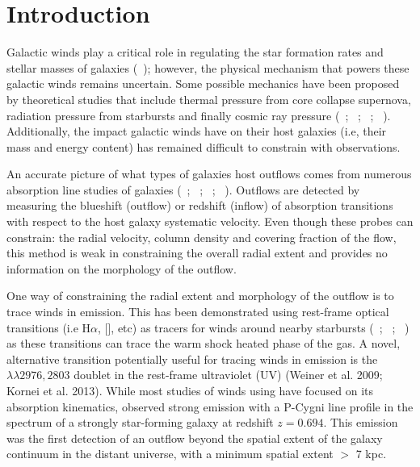 \documentclass[twocolumn]{aastex61}
\newcommand{\citeth}[1]{(\citeauthor{#1}\ \citeyear{#1})}
\newcommand{\citethnop}[1]{\citeauthor{#1}\ \citeyear{#1}}
\begin{document}

\section{Introduction}\label{sec:intro}
Galactic winds play a critical role in regulating the star formation rates and stellar masses of galaxies \citeth{Werk_2014}; however, the physical mechanism that powers these galactic winds remains uncertain. Some possible mechanics have been proposed by theoretical studies that include thermal pressure from core collapse supernova, radiation pressure from starbursts and finally cosmic ray pressure (\citethnop{Larson_1974}; \citethnop{Chevalier_1985}; \citethnop{Springel_2003}; \citethnop{Sugahara_2017}). Additionally, the impact galactic winds have on their host galaxies (i.e, their mass and energy content) has remained difficult to constrain with observations.

An accurate picture of what types of galaxies host outflows comes from numerous absorption line studies of galaxies (\citethnop{Veilleux2005}; \citethnop{Weiner2009}; \citethnop{Martin2012}; \citethnop{Rubin_2014}). Outflows are detected by measuring the blueshift (outflow) or redshift (inflow) of absorption transitions with respect to the host galaxy systematic velocity.
Even though these probes can constrain: the radial velocity, column density and covering fraction of the flow, 
this method is weak in constraining the overall radial extent and provides no information on the morphology of the outflow.

One way of constraining the radial extent and morphology of the outflow is to trace winds in emission. This has been demonstrated using rest-frame optical transitions (i.e H$\alpha$, [], etc) as tracers for winds around nearby starbursts (\citethnop{Matsubayashi2009}; \citethnop{Veilleux2009}; \citethnop{Tripp2011}) as these transitions can trace the warm shock heated phase of the gas. 
A novel, alternative transition potentially useful for tracing winds in emission is the  $\lambda\lambda 2976,2803$ doublet in the rest-frame ultraviolet (UV)
(Weiner et al. 2009; Kornei et al. 2013)\nocite{Weiner2009, Kornei2013}. While most studies of winds using  have focused on its absorption kinematics, \cite{Rubin_2011} observed  strong  emission with a P-Cygni line profile in the spectrum of a strongly star-forming galaxy at redshift $z = 0.694$.  This emission was the first detection of an outflow beyond the spatial extent of the galaxy continuum in the distant universe, with a minimum spatial extent  $>$ 7 kpc.
\end{document}
